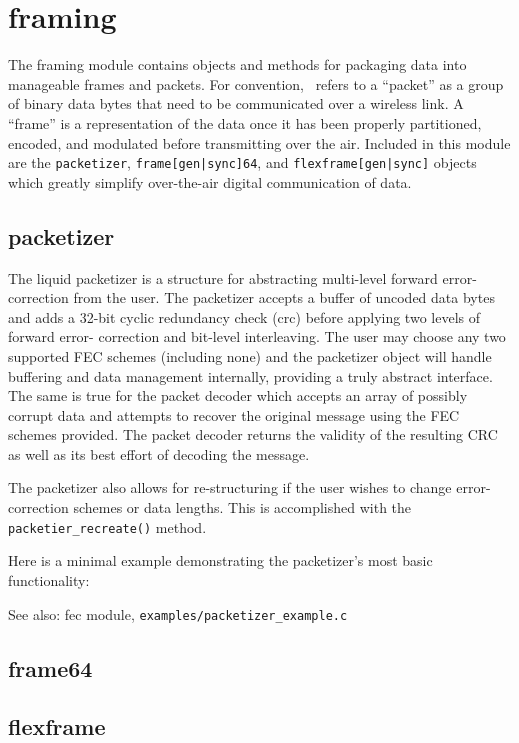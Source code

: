 % 
%

\section{framing}
\label{module:framing}
The framing module contains objects and methods for packaging data into
manageable frames and packets.
For convention, \liquid\ refers to a ``packet'' as a group of binary
data bytes that need to be communicated over a wireless link.
A ``frame'' is a representation of the data once it has been properly
partitioned, encoded, and modulated before transmitting over the air.
Included in this module are the {\tt packetizer}, 
{\tt frame[gen|sync]64}, and {\tt flexframe[gen|sync]} objects which
greatly simplify over-the-air digital communication of data.

\subsection{packetizer}
\label{module:framing:packetizer}

The liquid packetizer is a structure for abstracting multi-level forward
error-correction from the user.
The packetizer accepts a buffer of uncoded data bytes and adds a 32-bit
cyclic redundancy check (crc) before applying two levels of forward error-
correction and bit-level interleaving.  The user may choose any two 
supported FEC schemes (including none) and the packetizer object will
handle buffering and data management internally, providing a truly abstract
interface.  The same is true for the packet decoder which accepts an array
of possibly corrupt data and attempts to recover the original message using
the FEC schemes provided.  The packet decoder returns the validity of the
resulting CRC as well as its best effort of decoding the message.

The packetizer also allows for re-structuring if the user wishes to change
error-correction schemes or data lengths.  This is accomplished with the
{\tt packetier\_recreate()} method.

Here is a minimal example demonstrating the packetizer's most basic
functionality:


See also: fec module, {\tt examples/packetizer\_example.c}

\subsection{frame64}
\label{module:framing:frame64}

\subsection{flexframe}
\label{module:framing:flexframe}


